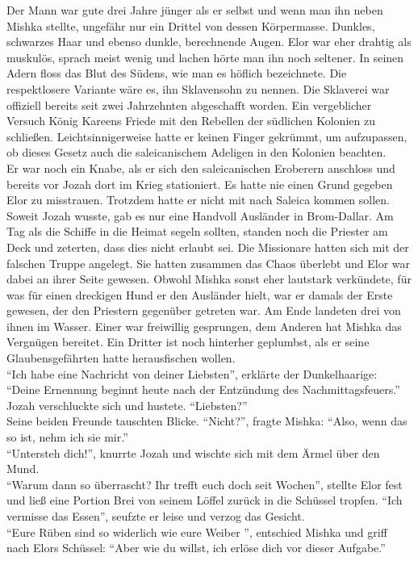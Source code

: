 Der Mann war gute drei Jahre jünger als er selbst und wenn man ihn neben Mishka stellte, ungefähr 
nur ein Drittel von dessen Körpermasse. Dunkles, schwarzes Haar und ebenso dunkle, berechnende 
Augen. Elor war eher drahtig als muskulös, sprach meist wenig und lachen hörte man ihn noch 
seltener. In seinen Adern floss das Blut des Südens, wie man es höflich bezeichnete. Die 
respektlosere Variante wäre es, ihn Sklavensohn zu nennen. Die Sklaverei war offiziell bereits seit 
zwei Jahrzehnten abgeschafft worden. Ein vergeblicher Versuch König Kareens Friede mit den Rebellen 
der südlichen Kolonien zu schließen. Leichtsinnigerweise hatte er keinen Finger gekrümmt, um 
aufzupassen, ob dieses Gesetz auch die saleicanischem Adeligen in den Kolonien beachten.\\
Er war noch ein Knabe, als er sich den saleicanischen Eroberern anschloss und bereits vor Jozah 
dort im Krieg stationiert. Es hatte nie einen Grund gegeben Elor zu misstrauen. Trotzdem hatte er 
nicht mit nach Saleica kommen sollen. Soweit Jozah wusste, gab es nur eine Handvoll Ausländer in 
Brom-Dallar. Am Tag als die Schiffe in die Heimat segeln sollten, standen noch die Priester am 
Deck und zeterten, dass dies nicht erlaubt sei. Die Missionare hatten sich mit der falschen Truppe 
angelegt. Sie hatten zusammen das Chaos überlebt und Elor war dabei an ihrer Seite gewesen. Obwohl 
Mishka sonst eher lautstark verkündete, für was für einen dreckigen Hund er den Ausländer hielt, war 
er damals der Erste gewesen, der den Priestern gegenüber getreten war. Am Ende landeten drei von 
ihnen im Wasser. Einer war freiwillig gesprungen, dem Anderen hat Mishka das Vergnügen bereitet. Ein 
Dritter ist noch hinterher geplumbst, als er seine Glaubensgefährten hatte herausfischen wollen.\\
``Ich habe eine Nachricht von deiner Liebsten'', erklärte der Dunkelhaarige: ``Deine Ernennung 
beginnt heute nach der Entzündung des Nachmittagsfeuers.''\\
Jozah verschluckte sich und hustete. ``Liebsten?''\\
Seine beiden Freunde tauschten Blicke. ``Nicht?'', fragte Mishka: ``Also, wenn das so ist, nehm ich 
sie mir.''\\
``Untersteh dich!'', knurrte Jozah und wischte sich mit dem Ärmel über den Mund.\\
``Warum dann so überrascht? Ihr trefft euch doch seit Wochen'', stellte Elor fest und ließ eine 
Portion Brei von seinem Löffel zurück in die Schüssel tropfen. ``Ich vermisse das Essen'', seufzte 
er leise und verzog das Gesicht.\\
``Eure Rüben sind so widerlich wie eure Weiber '', entschied Mishka und griff nach Elors Schüssel: 
``Aber wie du willst, ich erlöse dich vor dieser Aufgabe.''\\

